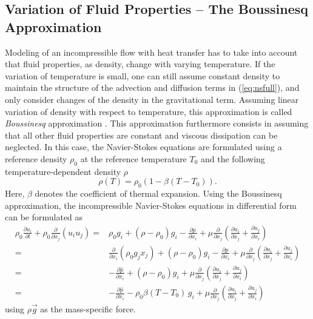 \subsection{Variation of Fluid Properties -- The Boussinesq Approximation}
\label{sec:boussinesq}

Modeling of an incompressible flow with heat transfer has to take into account that fluid properties, as density, change with varying temperature. If the variation of temperature is small, one can still assume constant density to maintain the structure of the advection and diffusion terms in (\ref{eq:nsfull}), and only consider changes of the density in the gravitational term. Assuming linear variation of density with respect to temperature, this approximation is called \emph{Boussinesq} approximation \cite{gray76}. This approximation furthermore consists in assuming that all other fluid properties are constant and viscous dissipation can be neglected. In this case, the Navier-Stokes equations are formulated using a reference density \(\rho_0\) at the reference temperature \(T_0\) and the following temperature-dependent density \(\rho\)
\begin{displaymath}
  \rho \left( T \right) = \rho_0 \left( 1 - \beta \left( T - T_0 \right) \right).
\end{displaymath}
Here, \(\beta\) denotes the coefficient of thermal expansion. Using the Boussinesq approximation, the incompressible Navier-Stokes equations in differential form can be formulated as
\begin{align*}
  \rho_0 \frac{\partial  u_i }{\partial t} 
  + \rho_0 \frac{\partial}{\partial x_j} \left( u_i  u_j \right) 
  =& \rho_0 g_i + \left(\rho - \rho_0 \right) g_i
  - \frac{\partial p}{\partial x_i}
  +  \mu \frac{\partial}{\partial x_j} \left( \frac{\partial u_i}{\partial x_j} 
  + \frac{\partial u_j}{\partial x_i} \right)  \\[0.5em]
  =& \frac{\partial}{\partial x_i}\left(\rho_0 g_j x_j \right) 
  + \left(\rho - \rho_0 \right) g_i
  - \frac{\partial p}{\partial x_i}
  +  \mu \frac{\partial}{\partial x_j} \left( \frac{\partial u_i}{\partial x_j} 
  + \frac{\partial u_j}{\partial x_i} \right)  \\[0.5em]
  =& - \frac{\partial \hat{p}}{\partial x_i} 
  + \left(\rho - \rho_0 \right) g_i
  +  \mu \frac{\partial}{\partial x_j} \left( \frac{\partial u_i}{\partial x_j} 
  + \frac{\partial u_j}{\partial x_i} \right)  \\[0.5em]
  =& - \frac{\partial \hat{p}}{\partial x_i} 
  - \rho_0 \beta \left( T - T_0 \right) \, g_i
  +  \mu \frac{\partial}{\partial x_j} \left( \frac{\partial u_i}{\partial x_j} 
                                       + \frac{\partial u_j}{\partial x_i} \right) 
\end{align*}
using \(\rho \vec{g}\) as the mass-specific force. 

